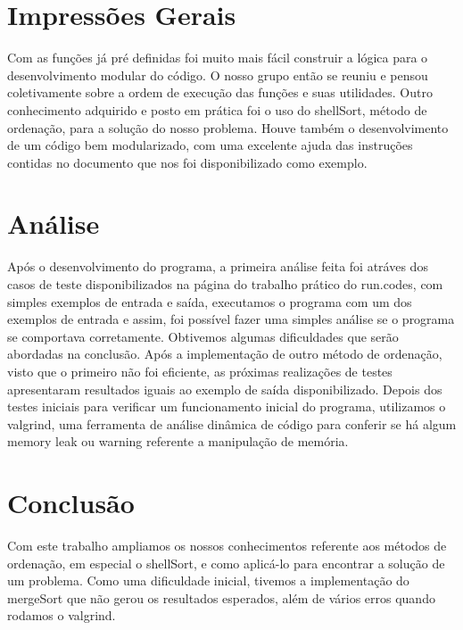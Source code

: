 \documentclass{article}
\begin{document}
\clearpage


\section{Impressões Gerais}

Com as funções já pré definidas foi muito mais fácil construir a lógica para o desenvolvimento modular do código. O nosso grupo então se reuniu e pensou coletivamente sobre a ordem de execução das funções e suas utilidades.
Outro conhecimento adquirido e posto em prática foi o uso do shellSort, método de ordenação, para a solução do nosso problema. Houve também o desenvolvimento de um código bem modularizado, com uma excelente ajuda das instruções contidas no documento que nos foi disponibilizado como exemplo.

\section{Análise}

Após o desenvolvimento do programa, a primeira análise feita foi atráves dos casos de teste disponibilizados na página do trabalho prático do run.codes, com simples exemplos de entrada e saída, executamos o programa com um dos exemplos de entrada e assim, foi possível fazer uma simples análise se o programa se comportava corretamente. Obtivemos algumas dificuldades que serão abordadas na conclusão. Após a implementação de outro método de ordenação, visto que o primeiro não foi eficiente, as próximas realizações de testes apresentaram resultados iguais ao exemplo de saída disponibilizado.
Depois dos testes iniciais para verificar um funcionamento inicial do programa, utilizamos o valgrind, uma ferramenta de análise dinâmica de código para conferir se há algum memory leak ou warning referente a manipulação de memória.


\section{Conclusão}

Com este trabalho ampliamos os nossos conhecimentos referente aos métodos de ordenação, em especial o shellSort, e como aplicá-lo para encontrar a solução de um problema.
Como uma dificuldade inicial, tivemos a implementação do mergeSort que não gerou os resultados esperados, além de vários erros quando rodamos o valgrind.
\end{document}
